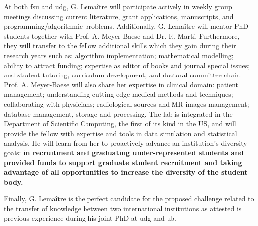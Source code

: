 At both \ac{fsu} and \ac{udg}, G. Lema\^itre will participate actively in weekly group meetings discussing current literature, grant applications, manuscripts, and programming/algorithmic problems.
Additionally, G. Lema\^itre will mentor PhD students together with Prof. A. Meyer-Baese and Dr. R. Mart\'i.
Furthermore, they will transfer to the fellow additional skills which they gain during their research years such as: algorithm implementation; mathematical modelling; ability to attract funding; expertise as editor of books and journal special issues; and student tutoring, curriculum development, and doctoral committee chair.
Prof. A. Meyer-Baese will also share her expertise in clinical domain: patient management; understanding cutting-edge medical methods and techniques; collaborating with physicians; radiological sources and MR images management; database management, storage and processing.
The lab is integrated in the Department of Scientific Computing, the first of its kind in the US, and will provide the fellow with expertise and tools in data simulation and statistical analysis.
He will learn from her to proactively advance an institution's diversity goals: \textbf{in recruitment and graduating under-represented students and provided funds to support graduate student recruitment and taking advantage of all opportunities to increase the diversity of the student body.}

Finally, G. Lema\^itre is the perfect candidate for the proposed challenge related to the transfer of knowledge between two international institutions as attested is previous experience during his joint PhD at \ac{udg} and \ac{ub}.






